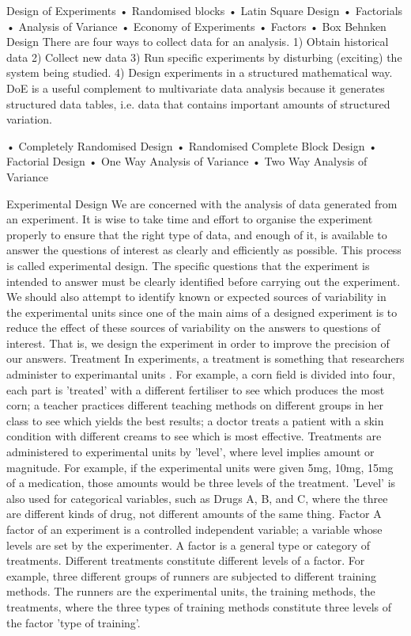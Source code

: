 Design of Experiments
•	Randomised blocks
•	Latin Square Design
•	Factorials
•	Analysis of Variance
•	Economy of Experiments
•	Factors
•	Box Behnken Design
There are four ways to collect data for an analysis.
1)	Obtain historical data
2)	Collect new data
3)	Run specific experiments by disturbing (exciting) the system being studied.
4)	Design experiments in a structured mathematical way.
DoE is a useful complement to multivariate data analysis because it generates  structured data tables, i.e. data that contains important amounts of structured variation.

•	Completely Randomised Design
•	Randomised Complete Block Design
•	Factorial Design
•	One Way Analysis of Variance
•	Two Way Analysis of Variance
 
Experimental Design 
We are concerned with the analysis of data generated from an experiment. It is wise to take time and effort to organise the experiment properly to ensure that the right type of data, and enough of it, is available to answer the questions of interest as clearly and efficiently as possible. This process is called experimental design.
The specific questions that the experiment is intended to answer must be clearly identified before carrying out the experiment. We should also attempt to identify known or expected sources of variability in the experimental units since one of the main aims of a designed experiment is to reduce the effect of these sources of variability on the answers to questions of interest. That is, we design the experiment in order to improve the precision of our answers.
Treatment 
In experiments, a treatment is something that researchers administer to experimantal units . For example, a corn field is divided into four, each part is 'treated' with a different fertiliser to see which produces the most corn; a teacher practices different teaching methods on different groups in her class to see which yields the best results; a doctor treats a patient with a skin condition with different creams to see which is most effective.
Treatments are administered to experimental units by 'level', where level implies amount or magnitude. For example, if the experimental units were given 5mg, 10mg, 15mg of a medication, those amounts would be three levels of the treatment. 'Level' is also used for categorical variables, such as Drugs A, B, and C, where the three are different kinds of drug, not different amounts of the same thing.
Factor 
A factor of an experiment is a controlled independent variable; a variable whose levels are set by the experimenter.
A factor is a general type or category of treatments. Different treatments constitute different levels of a factor. For example, three different groups of runners are subjected to different training methods. The runners are the experimental units, the training methods, the treatments, where the three types of training methods constitute three levels of the factor 'type of training'.
